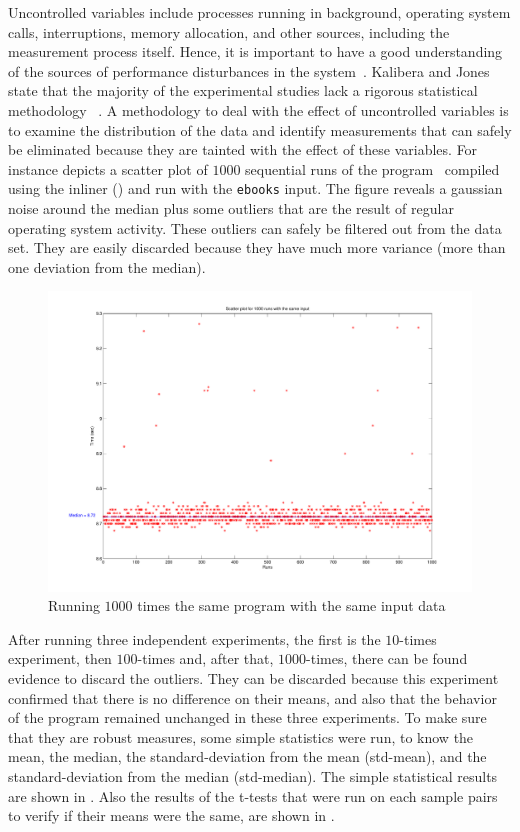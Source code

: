 Uncontrolled variables include processes running in background, operating system calls, interruptions, memory allocation, and other sources, including the measurement process itself. Hence, it is important to have a good understanding of the sources of performance disturbances in  the system~\cite{Kalibera2013}.
Kalibera and Jones state that the majority of the experimental studies lack a rigorous statistical methodology~ \cite{Kalibera2013}. A methodology to deal with the effect of uncontrolled variables is to examine the distribution of the data and identify measurements that can safely be eliminated because they are tainted with the effect of these variables. For instance  depicts a scatter plot of $1000$ sequential runs of the program \bzip\  compiled using the  inliner (\llvm) and run with the {\tt ebooks} input. The figure reveals a gaussian noise around the median plus some outliers that are the result of regular operating system activity. These outliers can safely be filtered out from the data set. They are easily discarded because they have much more variance (more than one deviation from the median).

\begin{figure}
  \centering
  \includegraphics[width=1.00\linewidth]{Figures/nt1000}
  \caption{Running $1000$ times the same program with the same input data}
  \label{fig:gauss}
\end{figure}

After running three independent experiments, the first is the $10$-times experiment, then $100$-times and, after that, $1000$-times, there can be found evidence to discard the outliers. They can be discarded because this experiment confirmed that there is no difference on their means, and also that the behavior of the program remained unchanged in these three experiments. To make sure that they are robust measures, some simple statistics were run, to know the mean, the median, the standard-deviation from the mean (std-mean), and the standard-deviation from the median (std-median). The simple statistical results are shown in . Also the results of the t-tests that were run on each sample pairs to verify if their means were the same, are shown in .


